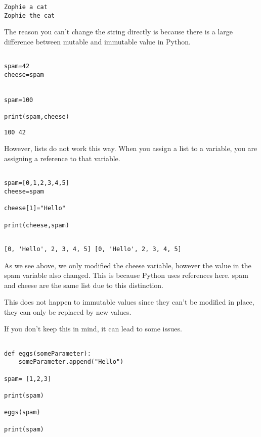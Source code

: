 \documentclass[11pt]{article}
\begin{document}
\begin{verbatim}
Zophie a cat
Zophie the cat
\end{verbatim}


The reason you can't change the string directly is because there is a large difference between mutable and immutable value in Python.


\begin{verbatim}

spam=42
cheese=spam


spam=100

print(spam,cheese)

\end{verbatim}

\begin{verbatim}
100 42
\end{verbatim}


However, lists do not work this way. When you assign a list to a variable, you are assigning a reference to that variable.


\begin{verbatim}

spam=[0,1,2,3,4,5]
cheese=spam

cheese[1]="Hello"

print(cheese,spam)


\end{verbatim}

\begin{verbatim}
[0, 'Hello', 2, 3, 4, 5] [0, 'Hello', 2, 3, 4, 5]
\end{verbatim}


As we see above, we only modified the cheese variable, however the value in the spam variable also changed. This is because Python uses references here. spam and cheese are the same list due to this distinction.


This does not happen to immutable values since they can't be modified in place, they can only be replaced by new values.

If you don't keep this in mind, it can lead to some issues.

\begin{verbatim}

def eggs(someParameter):
    someParameter.append("Hello")

spam= [1,2,3]

print(spam)

eggs(spam)

print(spam)

\end{verbatim}
\end{document}
